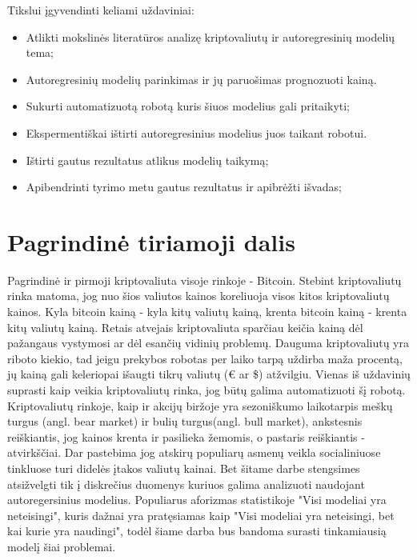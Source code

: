 \documentclass{VUMIFInfKursinis}
\begin{document}
Tikslui įgyvendinti keliami uždaviniai:
\begin{itemize}
  \item Atlikti mokslinės literatūros analizę kriptovaliutų ir autoregresinių modelių tema;
  \item Autoregresinių modelių parinkimas ir jų paruošimas prognozuoti kainą.
  \item Sukurti automatizuotą robotą kuris šiuos modelius gali pritaikyti;
  \item Ekspermentiškai ištirti autoregresinius modelius juos taikant robotui.
  \item Ištirti gautus rezultatus atlikus modelių taikymą;
  \item Apibendrinti tyrimo metu gautus rezultatus ir apibrėžti išvadas;
\end{itemize}


\section{Pagrindinė tiriamoji dalis}
Pagrindinė ir pirmoji kriptovaliuta visoje rinkoje - Bitcoin. Stebint kriptovaliutų rinka matoma, jog nuo šios valiutos kainos koreliuoja visos kitos kriptovaliutų kainos.
Kyla bitcoin kainą - kyla kitų valiutų kainą, krenta bitcoin kainą - krenta kitų valiutų kainą. Retais atvejais kriptovaliuta sparčiau keičia kainą dėl pažangaus vystymosi ar dėl
esančių vidinių problemų. Dauguma kriptovaliutų yra riboto kiekio, tad jeigu prekybos robotas per laiko tarpą uždirba maža procentą, jų kainą gali keleriopai išaugti
tikrų valiutų (€ ar \$) atžvilgiu. Vienas iš uždavinių suprasti kaip veikia kriptovaliutų rinka, jog būtų galima automatizuoti šį robotą. Kriptovaliutų rinkoje, kaip ir
akcijų biržoje yra sezoniškumo laikotarpis meškų turgus (angl. bear market) ir bulių turgus(angl. bull market), ankstesnis reiškiantis, jog kainos krenta ir pasilieka žemomis,
o pastaris reiškiantis - atvirkščiai. Dar pastebima jog atskirų populiarų asmenų veikla socialiniuose tinkluose turi didelės įtakos valiutų kainai. Bet šitame darbe stengsimes
atsižvelgti tik į diskrečius duomenys kuriuos galima analizuoti naudojant autoregersinius modelius. Populiarus aforizmas statistikoje "Visi modeliai yra neteisingi", kuris
dažnai yra pratęsiamas kaip "Visi modeliai yra neteisingi, bet kai kurie yra naudingi", todėl šiame darba bus bandoma surasti tinkamiausią modelį šiai problemai.
\end{document}
